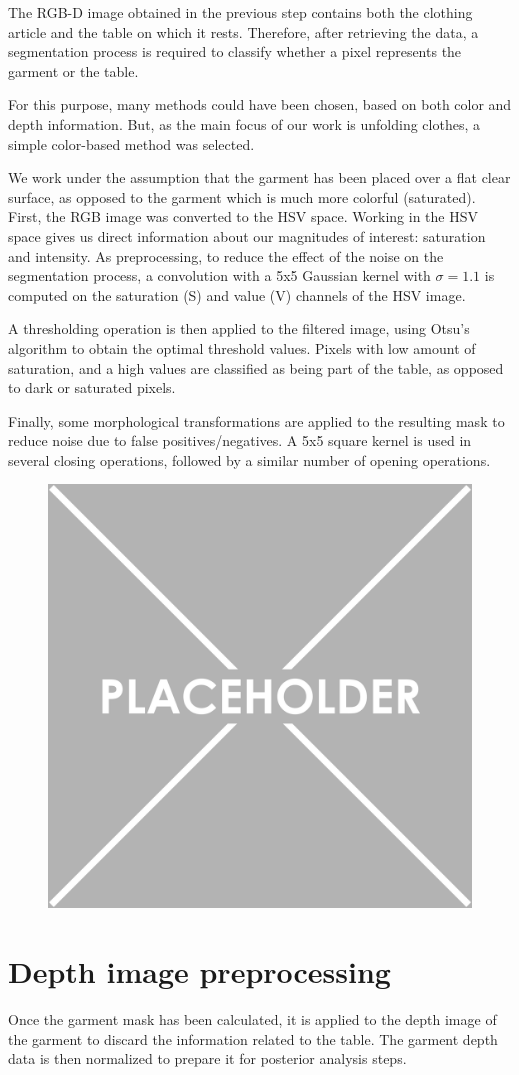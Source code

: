 The RGB-D image obtained in the previous step contains both the clothing article and the table on which it rests. Therefore, after retrieving the data, a segmentation process is required to classify whether a pixel represents the garment or the table.

For this purpose, many methods could have been chosen, based on both color and depth information. But, as the main focus of our work is unfolding clothes, a simple color-based method was selected. 

We work under the assumption that the garment has been placed over a flat clear surface, as opposed to the garment which is much more colorful (saturated). First, the RGB image was converted to the HSV space. Working in the HSV space gives us direct information about our magnitudes of interest: saturation and intensity. As preprocessing, to reduce the effect of the noise on the segmentation process, a convolution with a 5x5 Gaussian kernel with $\sigma=1.1$ is computed on the saturation (S) and value (V) channels of the HSV image.

A thresholding operation is then applied to the filtered image, using Otsu's algorithm  to obtain the optimal threshold values. Pixels with low amount of saturation, and a high values are classified as being part of the table, as opposed to dark or saturated pixels.

Finally, some morphological transformations are applied to the resulting mask to reduce noise due to false positives/negatives. A 5x5 square kernel is used in several closing operations, followed by a similar number of opening operations.


\begin{figure}[thpb]
    \centering
    \includegraphics[width=0.48
    \textwidth]{figures/placeholder.png}
    \caption{}
    \label{fig:segmentation_mask}
\end{figure}

\section{Depth image preprocessing}
\label{depth_image_preprocessing}

Once the garment mask has been calculated, it is applied to the depth image of the garment to discard the information related to the table. The garment depth data is then normalized to prepare it for posterior analysis steps.